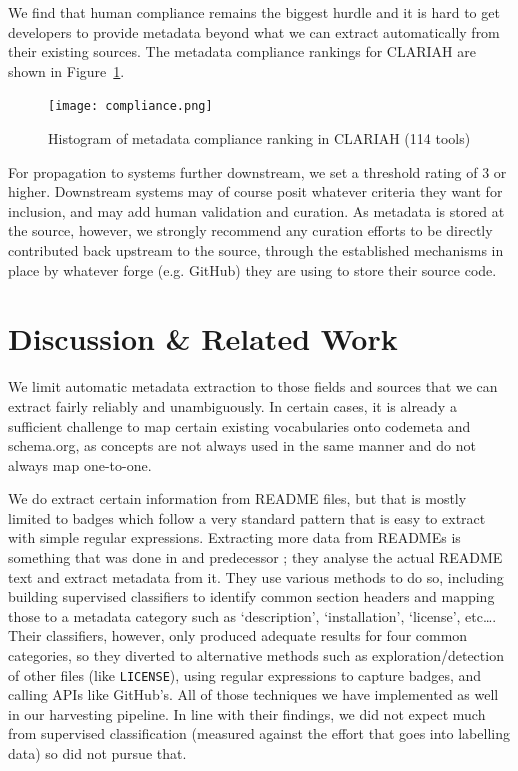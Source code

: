 \documentclass[a4paper,11pt]{article}
\begin{document}
We find that human compliance remains the biggest hurdle and it is hard to get
developers to provide metadata beyond what we can extract automatically from
their existing sources. The metadata compliance rankings for CLARIAH are shown
in Figure~\ref{fig:compliance}.

\begin{figure}[h!]
\begin{center}
\texttt{[image: compliance.png]}
\caption{Histogram of metadata compliance ranking in CLARIAH (114 tools)}
\end{center}
\label{fig:compliance}
\end{figure}

For propagation to systems further downstream, we set a threshold rating of 3
or higher. Downstream systems may of course posit whatever criteria they want
for inclusion, and may add human validation and curation. As metadata is stored
at the source, however, we strongly recommend any curation efforts to be
directly contributed back upstream to the source, through the established mechanisms
in place by whatever forge (e.g. GitHub) they are using to store their source
code.

\section{Discussion \& Related Work}

We limit automatic metadata extraction to those fields and sources that we can
extract fairly reliably and unambiguously. In certain cases, it is already a
sufficient challenge to map certain existing vocabularies onto codemeta and
schema.org, as concepts are not always used in the same manner and do not always
map one-to-one.

We do extract certain information from README files, but that is mostly limited to
badges which follow a very standard pattern that is easy to extract with simple
regular expressions. Extracting more data from READMEs is something that was
done in \cite{SOMEF} and predecessor \cite{SOMEF19}; they analyse the actual
README text and extract metadata from it. They use various methods to do so,
including building supervised classifiers to identify common section headers
and mapping those to a metadata category such as `description', `installation',
`license', etc\ldots. Their classifiers, however, only produced adequate
results for four common categories, so they diverted to alternative methods
such as exploration/detection of other files (like \texttt{LICENSE}), using
regular expressions to capture badges, and calling APIs like GitHub's. All of
those techniques we have implemented as well in our harvesting pipeline. In
line with their findings, we did not expect much from supervised classification
(measured against the effort that goes into labelling data) so did not pursue
that.
\end{document}
